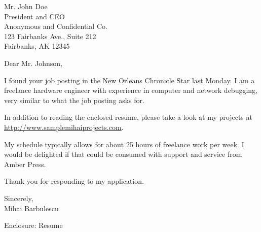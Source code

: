 \documentclass[a4paper,12pt]{letter}
\renewcommand{\encl}{Enclosure: }
\begin{document}

\begin{letter}{Mr. John Doe\\
President and CEO\\
Anonymous and Confidential Co.\\
123 Fairbanks Ave., Suite 212\\
Fairbanks, AK 12345}
\address{Number Street Namet, \\
	City, Country}

\opening{Dear Mr. Johnson,}

\vspace{1.5cm}
I found your job posting in the New Orleans Chronicle Star last Monday. I am a freelance hardware engineer with experience in computer and network debugging, very similar to what the job posting asks for.

In addition to reading the enclosed resume, please take a look at my projects at \url{http://www.samplemihaiprojects.com}. 

My schedule typically allows for about 25 hours of freelance work per week.
 I would be delighted if that could be consumed with support and service from Amber Press.

Thank you for responding to my application.
\vspace{1.5cm}
\signature{  } %

\closing{Sincerely,\\Mihai Barbulescu}

\encl{Resume}

\end{letter}
\end{document}
